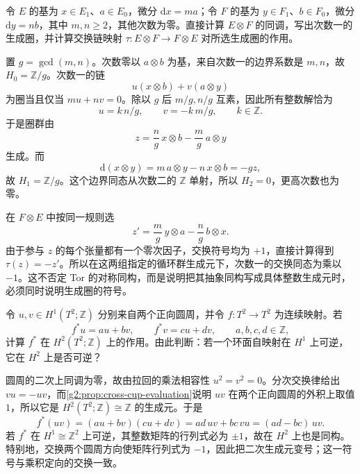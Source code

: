 \begin{exercise}\label{g2:ex:explicit-mixed-tor-cycle}
	令 \(E\) 的基为 \(x\in E_1\)、\(a\in E_0\)，微分 \(\mathrm{d}x=ma\)；令 \(F\) 的基为 \(y\in F_1\)、\(b\in F_0\)，微分 \(\mathrm{d}y=nb\)，其中 \(m,n\ge2\)，其他次数为零。直接计算 \(E\otimes F\) 的同调，写出次数一的生成圈，并计算交换链映射 \(\tau:E\otimes F\to F\otimes E\) 对所选生成圈的作用。
\end{exercise}
\begin{solution}
	置 \(g=\gcd(m,n)\)。次数零以 \(a\otimes b\) 为基，来自次数一的边界系数是 \(m,n\)，故 \(H_0=\mathbb Z/g\)。次数一的链
	\[
		u(x\otimes b)+v(a\otimes y)
	\]
	为圈当且仅当 \(mu+nv=0\)。除以 \(g\) 后 \(m/g,n/g\) 互素，因此所有整数解恰为
	\[
		u=k\,n/g,\qquad v=-k\,m/g,\qquad k\in\mathbb Z.
	\]
	于是圈群由
	\[
		z=\frac ng\,x\otimes b-\frac mg\,a\otimes y
	\]
	生成。而
	\[
		\mathrm{d}(x\otimes y)=m\,a\otimes y-n\,x\otimes b=-gz,
	\]
	故 \(H_1=\mathbb Z/g\)。这个边界同态从次数二的 \(\mathbb Z\) 单射，所以 \(H_2=0\)，更高次数也为零。

	在 \(F\otimes E\) 中按同一规则选
	\[
		z'=\frac mg\,y\otimes a-\frac ng\,b\otimes x.
	\]
	由于参与 \(z\) 的每个张量都有一个零次因子，交换符号均为 \(+1\)，直接计算得到 \(\tau(z)=-z'\)。所以在这两组指定的循环群生成元下，次数一的交换同态为乘以 \(-1\)。这不否定 Tor 的对称同构，而是说明把其抽象同构写成具体整数生成元时，必须同时说明生成圈的符号。
\end{solution}

\begin{exercise}\label{g2:ex:torus-map-determinant-cup}
	令 \(u,v\in H^1(T^2;\mathbb Z)\) 分别来自两个正向圆周，并令 \(f:T^2\to T^2\) 为连续映射。若
	\[
		f^*u=au+bv,\qquad f^*v=cu+dv,
		\qquad a,b,c,d\in\mathbb Z,
	\]
	计算 \(f^*\) 在 \(H^2(T^2;\mathbb Z)\) 上的作用。由此判断：若一个环面自映射在 \(H^1\) 上可逆，它在 \(H^2\) 上是否可逆？
\end{exercise}
\begin{solution}
	圆周的二次上同调为零，故由拉回的乘法相容性 \(u^2=v^2=0\)。分次交换律给出 \(vu=-uv\)，而\cref{g2:prop:cross-cup-evaluation}说明 \(uv\) 在两个正向圆周的外积上取值 \(1\)，所以它是 \(H^2(T^2;\mathbb Z)\cong\mathbb Z\) 的生成元。于是
	\[
		f^*(uv)=(au+bv)(cu+dv)
		=ad\,uv+bc\,vu=(ad-bc)\,uv.
	\]
	若 \(f^*\) 在 \(H^1\cong\mathbb Z^2\) 上可逆，其整数矩阵的行列式必为 \(\pm1\)，故在 \(H^2\) 上也是同构。特别地，交换两个圆周方向使矩阵行列式为 \(-1\)，因此把二次生成元变号；这一符号与乘积定向的交换一致。
\end{solution}

